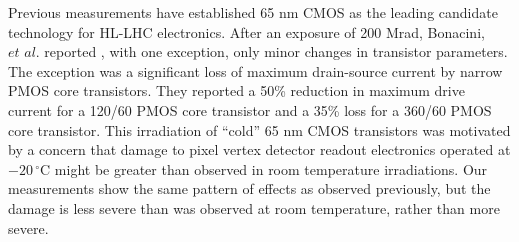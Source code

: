 Previous measurements have established 65 nm CMOS as the leading candidate technology for HL-LHC electronics.
After an exposure of 200 Mrad, Bonacini, $\textit{et al.}$ reported \cite{Bonacini}, with one exception, only minor changes in transistor parameters.
The exception was a significant loss of maximum drain-source current by narrow PMOS core transistors.   They reported a 50\% reduction in maximum drive current for a 120/60 PMOS core transistor and a 35\% loss for a 360/60 PMOS core transistor.
This irradiation of ``cold'' 65 nm CMOS transistors was motivated by a concern that damage to pixel vertex detector readout electronics operated at $-20\,^{\circ}\mathrm{C}$ might be greater than observed in room temperature irradiations.  Our measurements show the same pattern of effects as observed previously, but the damage is less severe than was observed at room temperature, rather than more severe.
